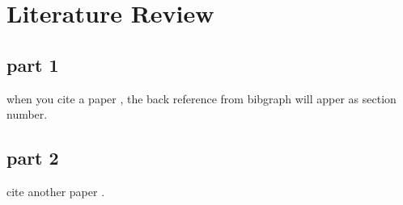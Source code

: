 
\chapter{Literature Review} %
\label{ch:literature_review} %


\section{part 1}

when you cite a paper \cite{bauschke2011convex}, the back reference from bibgraph will apper as section number.

\section{part 2}

cite another paper \cite{DynamicOptim_Opportunities_challenges}.
